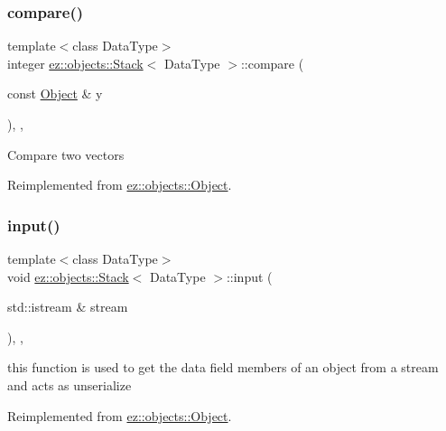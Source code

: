 \subsubsection{\texorpdfstring{compare()}{compare()}}
{\footnotesize\ttfamily template$<$class Data\+Type$>$ \\
integer \hyperlink{classez_1_1objects_1_1Stack}{ez\+::objects\+::\+Stack}$<$ Data\+Type $>$\+::compare (\begin{DoxyParamCaption}\item[{const \hyperlink{classez_1_1objects_1_1Object}{Object} \&}]{y }\end{DoxyParamCaption})\hspace{0.3cm}{\ttfamily [inline]}, {\ttfamily [override]}, {\ttfamily [virtual]}}

Compare two vectors 

Reimplemented from \hyperlink{classez_1_1objects_1_1Object_aca311d389dffa204e425463145f4e1e6}{ez\+::objects\+::\+Object}.

\mbox{\label{classez_1_1objects_1_1Stack_a3e9796e6bbad1be135c1911e20ec4a8a}} 
\subsubsection{\texorpdfstring{input()}{input()}}
{\footnotesize\ttfamily template$<$class Data\+Type$>$ \\
void \hyperlink{classez_1_1objects_1_1Stack}{ez\+::objects\+::\+Stack}$<$ Data\+Type $>$\+::input (\begin{DoxyParamCaption}\item[{std\+::istream \&}]{stream }\end{DoxyParamCaption})\hspace{0.3cm}{\ttfamily [inline]}, {\ttfamily [override]}, {\ttfamily [virtual]}}

this function is used to get the data field members of an object from a stream and acts as unserialize 

Reimplemented from \hyperlink{classez_1_1objects_1_1Object_a878bdc53b7f16fda6fa15dab214c4b6a}{ez\+::objects\+::\+Object}.

\mbox{\label{classez_1_1objects_1_1Stack_a62bd262732579e443d8147d2c2072801}} 
